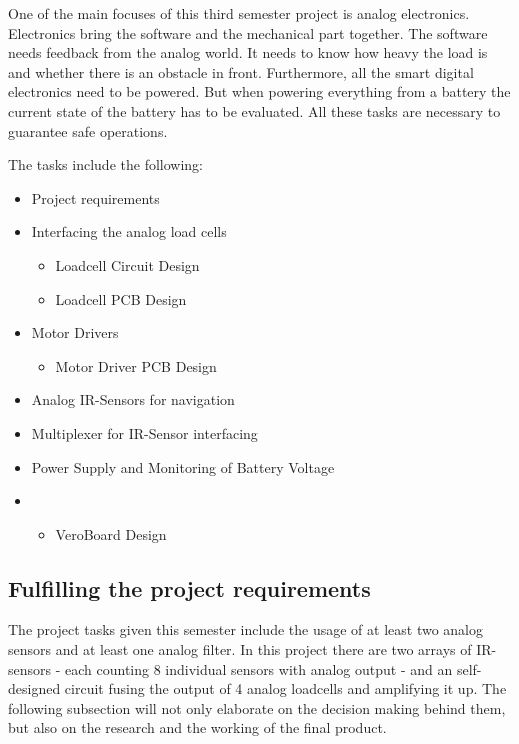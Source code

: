 \documentclass[../report.tex]{subfiles}
\begin{document}
One of the main focuses of this third semester project is analog electronics. Electronics bring the software and the mechanical part together. 
The software needs feedback from the analog world. It needs to know how heavy the load is and
whether there is an obstacle in front. Furthermore, all the smart digital electronics need to be powered. 
But when powering everything from a battery the current state of the battery has to be evaluated.
All these tasks are necessary to guarantee safe operations.

\quad
The tasks include the following:

\begin{itemize}
    \item Project requirements 
    \item Interfacing the analog load cells
    \begin{itemize}
      \item Loadcell Circuit Design
      \item Loadcell PCB Design
    \end{itemize} 
    \item Motor Drivers
    \begin{itemize}
      \item Motor Driver PCB Design
    \end{itemize}  
    \item Analog IR-Sensors for navigation
    \item Multiplexer for IR-Sensor interfacing
    \item Power Supply and Monitoring of Battery Voltage
    \item \begin{itemize}
      \item VeroBoard Design
    \end{itemize}
\end{itemize}

\subsection{Fulfilling the project requirements}
The project tasks given this semester include the usage of at least two analog sensors
and at least one analog filter. In this project there are two arrays of
IR-sensors - each counting 8 individual sensors with analog output - and 
an self-designed circuit fusing the output of 4 analog loadcells and amplifying 
it up. The following subsection will not only elaborate on the decision making
behind them, but also on the research and the working of the final product. 
  
\end{document}
